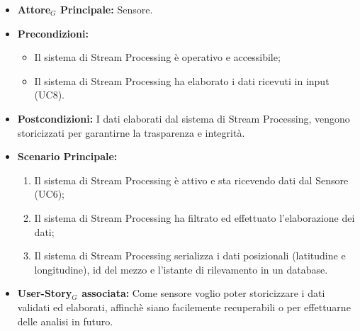 \documentclass[11pt]{article}
\begin{document}
\begin{justify}
\label{UC9}
\begin{itemize}
    \item \textbf{Attore$_G$ Principale:} Sensore.
    \item \textbf{Precondizioni:} 
        \begin{itemize}
          \item Il sistema di Stream Processing è operativo e accessibile;
            \item Il sistema di Stream Processing ha elaborato i dati ricevuti in input (UC8).
        \end{itemize}
      \item \textbf{Postcondizioni:} I dati elaborati dal sistema di Stream Processing, vengono storicizzati per garantirne la trasparenza e integrità.\\
    \item \textbf{Scenario Principale:} 
        \begin{enumerate}
        \item Il sistema di Stream Processing è attivo e sta ricevendo dati dal Sensore (UC6);
        \item Il sistema di Stream Processing ha filtrato ed effettuato l'elaborazione dei dati;
        \item Il sistema di Stream Processing serializza i dati posizionali (latitudine e longitudine), id del mezzo e l'istante di rilevamento in un database. 
        \end{enumerate}
    \item \textbf{User-Story$_G$ associata:} Come sensore voglio poter storicizzare i dati validati ed elaborati, affinchè siano facilemente recuperabili o per effettuarne delle analisi in futuro.
\end{itemize}



\end{justify}
\end{document}
